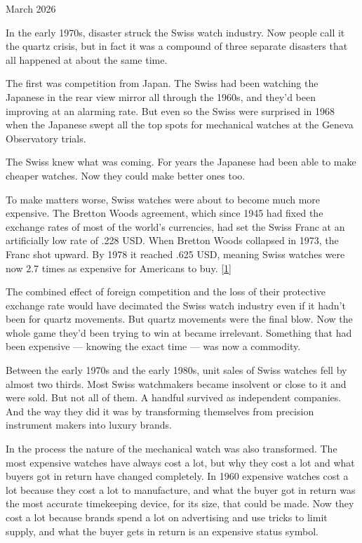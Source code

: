March 2026

In the early 1970s, disaster struck the Swiss watch industry. Now people
call it the quartz crisis, but in fact it was a compound of three
separate disasters that all happened at about the same time.

The first was competition from Japan. The Swiss had been watching the
Japanese in the rear view mirror all through the 1960s, and they'd been
improving at an alarming rate. But even so the Swiss were surprised in
1968 when the Japanese swept all the top spots for mechanical watches at
the Geneva Observatory trials.

The Swiss knew what was coming. For years the Japanese had been able to
make cheaper watches. Now they could make better ones too.

To make matters worse, Swiss watches were about to become much more
expensive. The Bretton Woods agreement, which since 1945 had fixed the
exchange rates of most of the world's currencies, had set the Swiss
Franc at an artificially low rate of .228 USD. When Bretton Woods
collapsed in 1973, the Franc shot upward. By 1978 it reached .625 USD,
meaning Swiss watches were now 2.7 times as expensive for Americans to
buy. {[}\hyperref[f1n]{1}{]}

The combined effect of foreign competition and the loss of their
protective exchange rate would have decimated the Swiss watch industry
even if it hadn't been for quartz movements. But quartz movements were
the final blow. Now the whole game they'd been trying to win at became
irrelevant. Something that had been expensive --- knowing the exact time
--- was now a commodity.

Between the early 1970s and the early 1980s, unit sales of Swiss watches
fell by almost two thirds. Most Swiss watchmakers became insolvent or
close to it and were sold. But not all of them. A handful survived as
independent companies. And the way they did it was by transforming
themselves from precision instrument makers into luxury brands.

In the process the nature of the mechanical watch was also transformed.
The most expensive watches have always cost a lot, but why they cost a
lot and what buyers got in return have changed completely. In 1960
expensive watches cost a lot because they cost a lot to manufacture, and
what the buyer got in return was the most accurate timekeeping device,
for its size, that could be made. Now they cost a lot because brands
spend a lot on advertising and use tricks to limit supply, and what the
buyer gets in return is an expensive status symbol.

